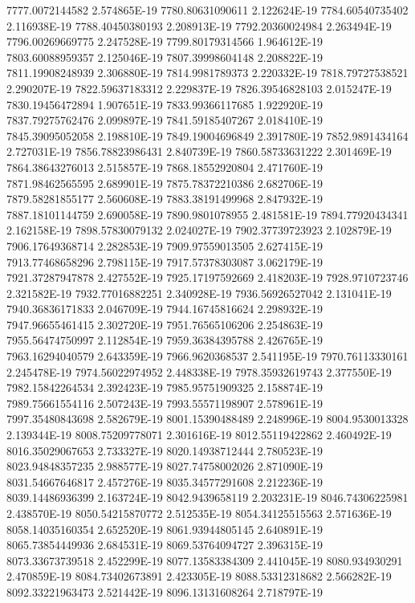 7777.0072144582  2.574865E-19
7780.80631090611  2.122624E-19
7784.60540735402  2.116938E-19
7788.40450380193  2.208913E-19
7792.20360024984  2.263494E-19
7796.00269669775  2.247528E-19
7799.80179314566  1.964612E-19
7803.60088959357  2.125046E-19
7807.39998604148  2.208822E-19
7811.19908248939  2.306880E-19
7814.9981789373  2.220332E-19
7818.79727538521  2.290207E-19
7822.59637183312  2.229837E-19
7826.39546828103  2.015247E-19
7830.19456472894  1.907651E-19
7833.99366117685  1.922920E-19
7837.79275762476  2.099897E-19
7841.59185407267  2.018410E-19
7845.39095052058  2.198810E-19
7849.19004696849  2.391780E-19
7852.9891434164  2.727031E-19
7856.78823986431  2.840739E-19
7860.58733631222  2.301469E-19
7864.38643276013  2.515857E-19
7868.18552920804  2.471760E-19
7871.98462565595  2.689901E-19
7875.78372210386  2.682706E-19
7879.58281855177  2.560608E-19
7883.38191499968  2.847932E-19
7887.18101144759  2.690058E-19
7890.9801078955  2.481581E-19
7894.77920434341  2.162158E-19
7898.57830079132  2.024027E-19
7902.37739723923  2.102879E-19
7906.17649368714  2.282853E-19
7909.97559013505  2.627415E-19
7913.77468658296  2.798115E-19
7917.57378303087  3.062179E-19
7921.37287947878  2.427552E-19
7925.17197592669  2.418203E-19
7928.9710723746  2.321582E-19
7932.77016882251  2.340928E-19
7936.56926527042  2.131041E-19
7940.36836171833  2.046709E-19
7944.16745816624  2.298932E-19
7947.96655461415  2.302720E-19
7951.76565106206  2.254863E-19
7955.56474750997  2.112854E-19
7959.36384395788  2.426765E-19
7963.16294040579  2.643359E-19
7966.9620368537  2.541195E-19
7970.76113330161  2.245478E-19
7974.56022974952  2.448338E-19
7978.35932619743  2.377550E-19
7982.15842264534  2.392423E-19
7985.95751909325  2.158874E-19
7989.75661554116  2.507243E-19
7993.55571198907  2.578961E-19
7997.35480843698  2.582679E-19
8001.15390488489  2.248996E-19
8004.9530013328  2.139344E-19
8008.75209778071  2.301616E-19
8012.55119422862  2.460492E-19
8016.35029067653  2.733327E-19
8020.14938712444  2.780523E-19
8023.94848357235  2.988577E-19
8027.74758002026  2.871090E-19
8031.54667646817  2.457276E-19
8035.34577291608  2.212236E-19
8039.14486936399  2.163724E-19
8042.9439658119  2.203231E-19
8046.74306225981  2.438570E-19
8050.54215870772  2.512535E-19
8054.34125515563  2.571636E-19
8058.14035160354  2.652520E-19
8061.93944805145  2.640891E-19
8065.73854449936  2.684531E-19
8069.53764094727  2.396315E-19
8073.33673739518  2.452299E-19
8077.13583384309  2.441045E-19
8080.934930291  2.470859E-19
8084.73402673891  2.423305E-19
8088.53312318682  2.566282E-19
8092.33221963473  2.521442E-19
8096.13131608264  2.718797E-19
